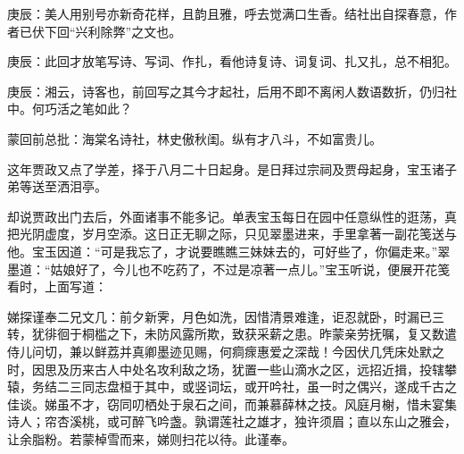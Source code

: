 \begin{parag}
    \begin{note}庚辰：美人用别号亦新奇花样，且韵且雅，呼去觉满口生香。结社出自探春意，作者已伏下回“兴利除弊”之文也。\end{note}
\end{parag}


\begin{parag}
    \begin{note}庚辰：此回才放笔写诗、写词、作扎，看他诗复诗、词复词、扎又扎，总不相犯。\end{note}
\end{parag}


\begin{parag}
    \begin{note}庚辰：湘云，诗客也，前回写之其今才起社，后用不即不离闲人数语数折，仍归社中。何巧活之笔如此？\end{note}
\end{parag}


\begin{parag}
    \begin{note}蒙回前总批：海棠名诗社，林史傲秋闺。纵有才八斗，不如富贵儿。\end{note}
\end{parag}


\begin{parag}
    这年贾政又点了学差，择于八月二十日起身。是日拜过宗祠及贾母起身，宝玉诸子弟等送至洒泪亭。
\end{parag}


\begin{parag}
    却说贾政出门去后，外面诸事不能多记。单表宝玉每日在园中任意纵性的逛荡，真把光阴虚度，岁月空添。这日正无聊之际，只见翠墨进来，手里拿著一副花笺送与他。宝玉因道：“可是我忘了，才说要瞧瞧三妹妹去的，可好些了，你偏走来。”翠墨道：“姑娘好了，今儿也不吃药了，不过是凉著一点儿。”宝玉听说，便展开花笺看时，上面写道：
\end{parag}

\begin{qute2sp}
    娣探谨奉二兄文几：前夕新霁，月色如洗，因惜清景难逢，讵忍就卧，时漏已三转，犹徘徊于桐槛之下，未防风露所欺，致获采薪之患。昨蒙亲劳抚嘱，复又数遣侍儿问切，兼以鲜荔并真卿墨迹见赐，何痌瘝惠爱之深哉！今因伏几凭床处默之时，因思及历来古人中处名攻利敌之场，犹置一些山滴水之区，远招近揖，投辖攀辕，务结二三同志盘桓于其中，或竖词坛，或开吟社，虽一时之偶兴，遂成千古之佳谈。娣虽不才，窃同叨栖处于泉石之间，而兼慕薛林之技。风庭月榭，惜未宴集诗人；帘杏溪桃，或可醉飞吟盏。孰谓莲社之雄才，独许须眉；直以东山之雅会，让余脂粉。若蒙棹雪而来，娣则扫花以待。此谨奉。
\end{qute2sp}


